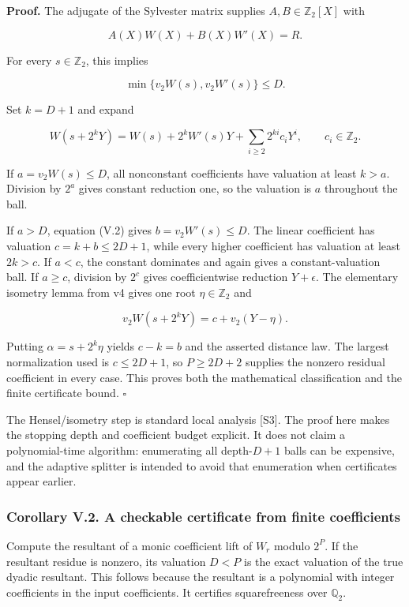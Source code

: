 \documentclass[11pt,letterpaper]{article}
\begin{document}
\textbf{Proof.} The adjugate of the Sylvester matrix supplies \(A,B\in\mathbb Z_2[X]\) with

\[
A(X)W(X)+B(X)W'(X)=R.
\]

For every \(s\in\mathbb Z_2\), this implies

\[
\min\{v_2W(s),v_2W'(s)\}\le D. \tag{V.2}
\]

Set \(k=D+1\) and expand

\[
W(s+2^kY)=W(s)+2^kW'(s)Y+
\sum_{i\ge2}2^{ki}c_iY^i,
\qquad c_i\in\mathbb Z_2.
\]

If \(a=v_2W(s)\le D\), all nonconstant coefficients have valuation at least \(k>a\). Division by \(2^a\) gives constant reduction one, so the valuation is \(a\) throughout the ball.

If \(a>D\), equation (V.2) gives \(b=v_2W'(s)\le D\). The linear coefficient has valuation \(c=k+b\le2D+1\), while every higher coefficient has valuation at least \(2k>c\). If \(a<c\), the constant dominates and again gives a constant-valuation ball. If \(a\ge c\), division by \(2^c\) gives coefficientwise reduction \(Y+\epsilon\). The elementary isometry lemma from v4 gives one root \(\eta\in\mathbb Z_2\) and

\[
v_2W(s+2^kY)=c+v_2(Y-\eta).
\]

Putting \(\alpha=s+2^k\eta\) yields \(c-k=b\) and the asserted distance law. The largest normalization used is \(c\le2D+1\), so \(P\ge2D+2\) supplies the nonzero residual coefficient in every case. This proves both the mathematical classification and the finite certificate bound. \(\square\)

The Hensel/isometry step is standard local analysis {[}S3{]}. The proof here makes the stopping depth and coefficient budget explicit. It does not claim a polynomial-time algorithm: enumerating all depth-\(D+1\) balls can be expensive, and the adaptive splitter is intended to avoid that enumeration when certificates appear earlier.

\subsubsection{Corollary V.2. A checkable certificate from finite coefficients}\label{corollary-v.2.-a-checkable-certificate-from-finite-coefficients}

Compute the resultant of a monic coefficient lift of \(W_r\) modulo \(2^P\). If the resultant residue is nonzero, its valuation \(D<P\) is the exact valuation of the true dyadic resultant. This follows because the resultant is a polynomial with integer coefficients in the input coefficients. It certifies squarefreeness over \(\mathbb Q_2\).
\end{document}
